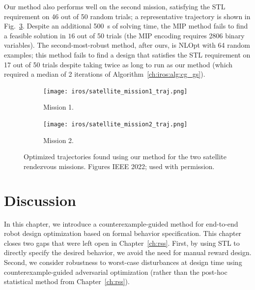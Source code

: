 Our method also performs well on the second mission, satisfying the STL requirement on 46 out of 50 random trials; a representative trajectory is shown in Fig.~\ref{ch:iros:fig:mission_2_traj}. Despite an additional \SI{500}{s} of solving time, the MIP method fails to find a feasible solution in $16$ out of 50 trials (the MIP encoding requires 2806 binary variables). The second-most-robust method, after ours, is NLOpt with 64 random examples; this method fails to find a design that satisfies the STL requirement on 17 out of 50 trials despite taking twice as long to run as our method (which required a median of 2 iterations of Algorithm~\ref{ch:iros:alg:cg_gs}).

\begin{figure}[tbh]
    \centering
    \begin{subfigure}[b]{0.45\linewidth}
        \centering
        \texttt{[image: iros/satellite\_mission1\_traj.png]}
        \caption{Mission 1.}
        \label{ch:iros:fig:mission_1_traj}
    \end{subfigure}
    \quad
    \begin{subfigure}[b]{0.45\linewidth}
        \centering
        \texttt{[image: iros/satellite\_mission2\_traj.png]}
        \caption{Mission 2.}
        \label{ch:iros:fig:mission_2_traj}
    \end{subfigure}
    \caption{Optimized trajectories found using our method for the two satellite rendezvous missions. Figures \textcopyright{} IEEE 2022; used with permission.}
\end{figure}

\section{Discussion}

In this chapter, we introduce a counterexample-guided method for end-to-end robot design optimization based on formal behavior specification. This chapter closes two gaps that were left open in Chapter~\ref{ch:rss}. First, by using STL to directly specify the desired behavior, we avoid the need for manual reward design. Second, we consider robustness to worst-case disturbances at design time using counterexample-guided adversarial optimization (rather than the post-hoc statistical method from Chapter~\ref{ch:rss}).

